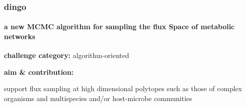 \documentclass{beamer}
\begin{document}


   \begin{darkframes}
      \begin{frame}
         \frametitle{\textbf{dingo} }
         \framesubtitle{a new MCMC algorithm for sampling the flux Space of metabolic networks }


         \small

         \textbf{challenge category: } algorithm-oriented

         \bigskip

         \textbf{aim \& contribution: }





         support flux sampling at high dimensional polytopes 
         such as those of complex organisms and multispecies and/or host-microbe communities 


      \end{frame}
   \end{darkframes}
\end{document}
